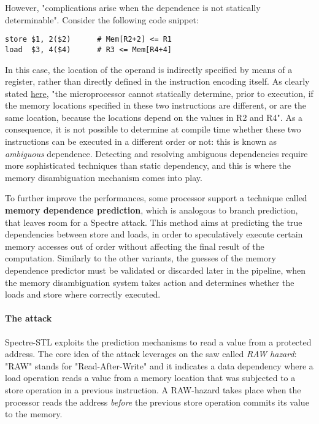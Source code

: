 \documentclass[12pt,a4paper]{book}
\theoremstyle{definition}
\begin{document}
	However, "complications arise when the dependence is not statically determinable". Consider the following code snippet:
	
	\begin{lstlisting}
store $1, 2($2)      # Mem[R2+2] <= R1
load  $3, 4($4)      # R3 <= Mem[R4+4]
	\end{lstlisting}
	In this case, the location of the operand is indirectly specified by means of a register, rather than directly defined in the instruction encoding itself. As clearly stated \href{https://en.wikipedia.org/wiki/Memory_disambiguation}{here}, "the microprocessor cannot statically determine, prior to execution, if the memory locations specified in these two instructions are different, or are the same location, because the locations depend on the values in R2 and R4". As a consequence, it is not possible to determine at compile time whether these two instructions can be executed in a different order or not: this is known as \textit{ambiguous} dependence. Detecting and resolving ambiguous dependencies require more sophisticated techniques than static dependency, and this is where the memory disambiguation mechanism comes into play.
	
	To further improve the performances, some processor support a technique called \textbf{memory dependence prediction}, which is analogous to branch prediction, that leaves room for a Spectre attack. This method aims at predicting the true dependencies between store and loads, in order to speculatively execute certain memory accesses out of order without affecting the final result of the computation. Similarly to the other variants, the guesses of the memory dependence predictor must be validated or discarded later in the pipeline, when the memory disambiguation system takes action and determines whether the loads and store where correctly executed.
	\paragraph{The attack} Spectre-STL exploits the prediction mechanisms to read a value from a protected address. The core idea of the attack leverages on the saw called \textit{RAW hazard}: "RAW" stands for "Read-After-Write" and it indicates a data dependency where a load operation reads a value from a memory location that was subjected to a store operation in a previous instruction. A RAW-hazard takes place when the processor reads the address \textit{before} the previous store operation commits its value to the memory.
	
\end{document}
